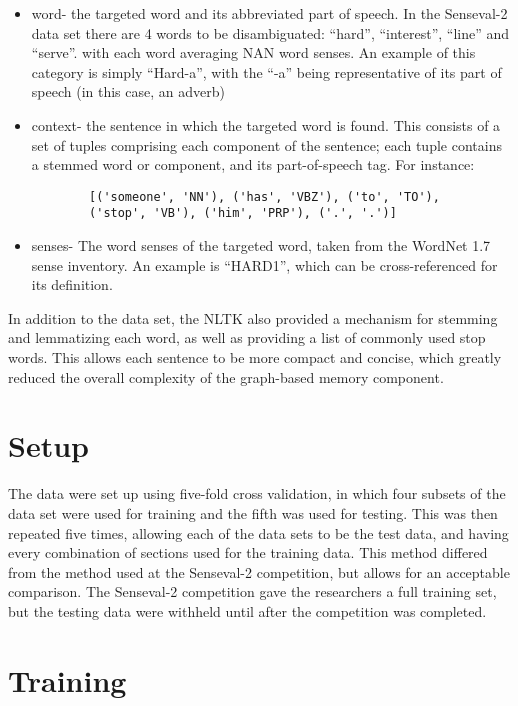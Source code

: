 \begin{itemize}     
	\item word- the targeted word and its abbreviated part of speech. In the 
	Senseval-2 data set there are 4 words to be disambiguated: ``hard'', 
	``interest'', ``line'' and ``serve''. with each word averaging NAN 
    word senses. An example of this category is simply
	``Hard-a'', with the ``-a'' being representative of its part of speech (in 
	this case, an adverb)
	\item context- the sentence in which the targeted word is found. This consists of 
	a set of tuples comprising each component of the sentence; each tuple 
	contains a stemmed word or component, and its part-of-speech tag. For 
	instance: 
	\begin{verbatim}
		[('someone', 'NN'), ('has', 'VBZ'), ('to', 'TO'), 
		('stop', 'VB'), ('him', 'PRP'), ('.', '.')] 
	\end{verbatim}

	\item senses- The word senses of the targeted word, taken from the WordNet 
	1.7 sense inventory. An example is ``HARD1'', which can be cross-referenced 
	for its definition. 
\end{itemize}

In addition to the data set, the NLTK also provided a mechanism for stemming and
lemmatizing each word, as well as providing a list of commonly used stop words.
This allows each sentence to be more compact and concise, which greatly reduced
the overall complexity of the graph-based memory component.

\section{Setup}

The data were set up using five-fold cross validation, in which four subsets of
the data set were used for training and the fifth was used for testing. This
was then repeated five times, allowing each of the data sets to be the test
data, and having every combination of sections used for the training data.  This method
differed from the method used at the Senseval-2 competition, but allows for an
acceptable comparison.  The Senseval-2 competition gave the researchers a full
training set, but the testing data were withheld until after the competition was completed.   

\section{Training}

